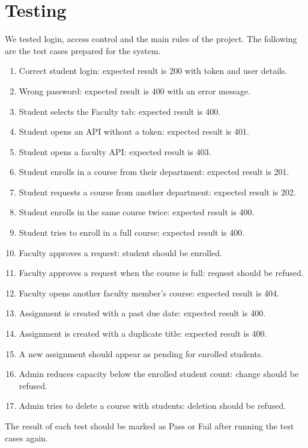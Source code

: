 \documentclass[11pt,a4paper]{article}
\begin{document}
\section{Testing}

We tested login, access control and the main rules of the project. The following
are the test cases prepared for the system.

\begin{enumerate}
    \item Correct student login: expected result is 200 with token and user details.
    \item Wrong password: expected result is 400 with an error message.
    \item Student selects the Faculty tab: expected result is 400.
    \item Student opens an API without a token: expected result is 401.
    \item Student opens a faculty API: expected result is 403.
    \item Student enrolls in a course from their department: expected result is 201.
    \item Student requests a course from another department: expected result is 202.
    \item Student enrolls in the same course twice: expected result is 400.
    \item Student tries to enroll in a full course: expected result is 400.
    \item Faculty approves a request: student should be enrolled.
    \item Faculty approves a request when the course is full: request should be refused.
    \item Faculty opens another faculty member's course: expected result is 404.
    \item Assignment is created with a past due date: expected result is 400.
    \item Assignment is created with a duplicate title: expected result is 400.
    \item A new assignment should appear as pending for enrolled students.
    \item Admin reduces capacity below the enrolled student count: change should be refused.
    \item Admin tries to delete a course with students: deletion should be refused.
\end{enumerate}

The result of each test should be marked as Pass or Fail after running the test
cases again.
\end{document}
